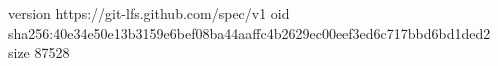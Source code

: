 version https://git-lfs.github.com/spec/v1
oid sha256:40e34e50e13b3159e6bef08ba44aaffc4b2629ec00eef3ed6c717bbd6bd1ded2
size 87528
